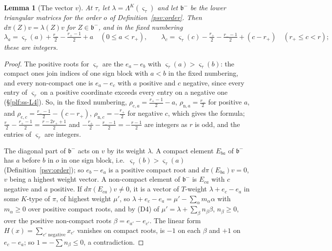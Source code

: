 \documentclass[10pt]{amsart}
\newtheorem{lemma}[theorem]{Lemma}
\theoremstyle{definition}
\theoremstyle{remark}
\begin{document}
\begin{lemma}[The vector $v$]\label{psv:v}
At $\tau$, let $\lambda=\Lambda^K(\varsigma_\tau)$ and let $\mathfrak b^-$ be the lower triangular matrices for the order
$o$ of Definition~\ref{psv:order}. Then $d\pi(Z)v=\lambda(Z)v$ for $Z\in\mathfrak b^-$, and in the fixed numbering
\[
\lambda_a=\varsigma_\tau(a)+\tfrac{r_-}2-\tfrac{r_+-1}2+a\quad(0\le a<r_+),\qquad
\lambda_c=\varsigma_\tau(c)-\tfrac{r_+}2-\tfrac{r_--1}2+(c-r_+)\quad(r_+\le c<r);
\]
these are integers.
\end{lemma}
\begin{proof}
The positive roots for $\varsigma_\tau$ are the $e_a-e_b$ with $\varsigma_\tau(a)>\varsigma_\tau(b)$: the compact ones join
indices of one sign block with $a<b$ in the fixed numbering, and every non-compact one is $e_a-e_c$
with $a$ positive and $c$ negative, since every entry of $\varsigma_\tau$ on a positive coordinate exceeds every
entry on a negative one (\S\ref{plf:ss-L4}). So, in the fixed numbering, $\rho_{\mathrm c,a}=\frac{r_+-1}2-a$,
$\rho_{\mathrm n,a}=\frac{r_-}2$ for positive $a$, and $\rho_{\mathrm c,c}=\frac{r_--1}2-(c-r_+)$, $\rho_{\mathrm n,c}=-\frac{r_+}2$
for negative $c$, which gives the formula; $\frac{r_-}2-\frac{r_+-1}2=\frac{r-2r_++1}2$ and $-\frac{r_+}2-\frac{r_--1}2=
-\frac{r-1}2$ are integers as $r$ is odd, and the entries of $\varsigma_\tau$ are integers.

The diagonal part of $\mathfrak b^-$ acts on $v$ by its weight $\lambda$. A compact element $E_{ba}$ of
$\mathfrak b^-$ has $a$ before $b$ in $o$ in one sign block, i.e.\ $\varsigma_\tau(b)>\varsigma_\tau(a)$
(Definition~\ref{psv:order}); so $e_b-e_a$ is a positive compact root and $d\pi(E_{ba})v=0$, $v$ being a highest
weight vector. A non-compact element of $\mathfrak b^-$ is $E_{ca}$ with $c$ negative and $a$ positive. If
$d\pi(E_{ca})v\ne0$, it is a vector of $T$-weight $\lambda+e_c-e_a$ in some $K$-type of $\pi$, of highest weight
$\mu'$, so $\lambda+e_c-e_a=\mu'-\sum_\alpha m_\alpha\alpha$ with $m_\alpha\ge0$ over positive compact roots, and by
(D4) of {\cite[\S4.2.3]{P53}} $\mu'=\lambda+\sum_\beta n_\beta\beta$, $n_\beta\ge0$, over the positive non-compact roots
$\beta=e_{a'}-e_{c'}$. The linear form $H(x)=\sum_{c'\text{ negative}}x_{c'}$ vanishes on compact roots, is $-1$ on
each $\beta$ and $+1$ on $e_c-e_a$; so $1=-\sum n_\beta\le0$, a contradiction.
\end{proof}
\end{document}
